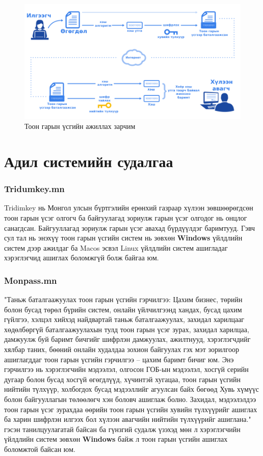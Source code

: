 \begin{figure}
	\centering
	\includegraphics[scale=0.5]{assets/digisigi.png}
	\caption{Тоон гарын үсгийн ажиллах зарчим}
	\label{fig:architecture}
\end{figure}

\section{Адил системийн судалгаа}
\subsubsection{Tridumkey.mn}
Tridimkey нь Монгол улсын бүртгэлийн ерөнхий газраар хүлээн зөвшөөрөгдсөн тоон гарын үсэг олгогч ба байгуулагад зориулж гарын үсэг олгодог нь онцлог санагдсан. Байгууллагад зориулж гарын үсэг авахад бүрдүүлдэг баримтууд.
Гэвч сул тал нь энэхүү тоон гарын үсгийн систем нь зөвхөн \textbf{Windows} үйлдлийн систем дээр ажилдаг ба Macos эсвэл Linux үйлдлийн систем ашигладаг хэрэглэгчид ашиглах боломжгүй болж байгаа юм.
\subsubsection{Monpass.mn}
"Таньж баталгаажуулах тоон гарын үсгийн гэрчилгээ: Цахим бизнес, төрийн болон бусад төрөл бүрийн систем, онлайн үйлчилгээнд хандах, бусад цахим гүйлгээ, хэлцэл хийхэд найдвартай таньж баталгаажуулах, захидал харилцааг хөдөлбөргүй баталгаажуулахын тулд тоон гарын үсэг зурах, захидал харилцаа, дамжуулж буй баримт бичгийг шифрлэн дамжуулах, ажилтнууд, хэрэглэгчдийг хялбар таних, бөөний онлайн худалдаа зохион байгуулах гэх мэт зорилгоор ашиглагддаг тоон гарын үсгийн гэрчилгээ – цахим баримт бичиг юм. Энэ гэрчилгээ нь хэрэглэгчийн мэдээлэл, олгосон ГОБ-ын мэдээлэл, хосгүй серийн дугаар болон бусад хосгүй өгөгдлүүд, хүчинтэй хугацаа, тоон гарын үсгийн нийтийн түлхүүр, холбогдох бусад мэдээллийг агуулсан байх бөгөөд Хувь хүмүүс болон байгууллагын төлөөлөгч хэн боловч ашиглаж болно. Захидал, мэдээлэлдээ тоон гарын үсэг зурахдаа өөрийн тоон гарын үсгийн хувийн түлхүүрийг ашиглах ба харин шифрлэн илгээх бол хүлээн авагчийн нийтийн түлхүүрийг ашиглана." гэсэн танилцуулагатай байсан ба гүнзгий судалж үзэхэд мөн л хэрэглэгчийн үйлдлийн систем зөвхөн \textbf{Windows} байж л тоон гарын үсгийн ашиглах боломжтой байсан юм.
\pagebreak
